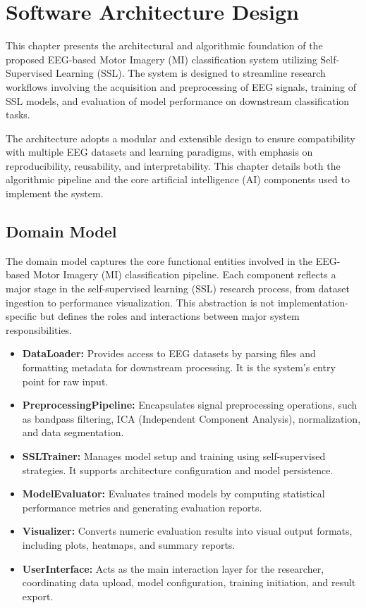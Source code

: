 \chapter{Software Architecture Design}
\label{ch:software-architecture-design}

This chapter presents the architectural and algorithmic foundation of the proposed EEG-based Motor Imagery (MI) classification system utilizing Self-Supervised Learning (SSL). The system is designed to streamline research workflows involving the acquisition and preprocessing of EEG signals, training of SSL models, and evaluation of model performance on downstream classification tasks.

The architecture adopts a modular and extensible design to ensure compatibility with multiple EEG datasets and learning paradigms, with emphasis on reproducibility, reusability, and interpretability. This chapter details both the algorithmic pipeline and the core artificial intelligence (AI) components used to implement the system.


\section{Domain Model}
\label{sec:domain-model}

The domain model captures the core functional entities involved in the EEG-based Motor Imagery (MI) classification pipeline. Each component reflects a major stage in the self-supervised learning (SSL) research process, from dataset ingestion to performance visualization. This abstraction is not implementation-specific but defines the roles and interactions between major system responsibilities.

\begin{itemize}
    \item \textbf{DataLoader:} Provides access to EEG datasets by parsing files and formatting metadata for downstream processing. It is the system’s entry point for raw input.
    \item \textbf{PreprocessingPipeline:} Encapsulates signal preprocessing operations, such as bandpass filtering, ICA (Independent Component Analysis), normalization, and data segmentation.
    \item \textbf{SSLTrainer:} Manages model setup and training using self-supervised strategies. It supports architecture configuration and model persistence.
    \item \textbf{ModelEvaluator:} Evaluates trained models by computing statistical performance metrics and generating evaluation reports.
    \item \textbf{Visualizer:} Converts numeric evaluation results into visual output formats, including plots, heatmaps, and summary reports.
    \item \textbf{UserInterface:} Acts as the main interaction layer for the researcher, coordinating data upload, model configuration, training initiation, and result export.
\end{itemize}

